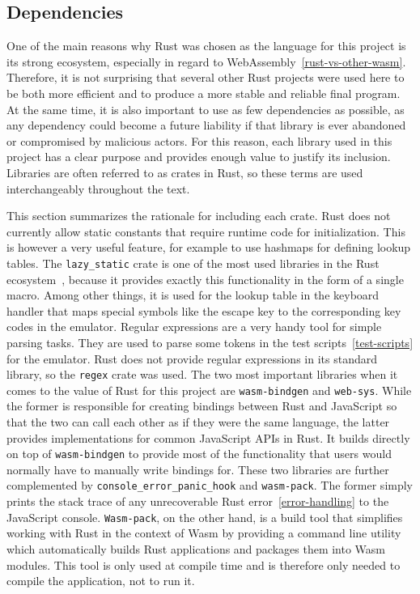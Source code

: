 \subsection{Dependencies}
\label{rust-deps}
One of the main reasons why Rust was chosen as the language for this project is its strong ecosystem, especially in regard to WebAssembly~\ref{rust-vs-other-wasm}.
Therefore, it is not surprising that several other Rust projects were used here to be both more efficient and to produce a more stable and reliable final program.
At the same time, it is also important to use as few dependencies as possible, as any dependency could become a future liability if that library is ever abandoned or compromised by malicious actors.
For this reason, each library used in this project has a clear purpose and provides enough value to justify its inclusion. Libraries are often referred to as crates in Rust, so these terms are used interchangeably throughout the text.

This section summarizes the rationale for including each crate.
Rust does not currently allow static constants that require runtime code for initialization.
This is however a very useful feature, for example to use hashmaps for defining lookup tables.
The \verb+lazy_static+ crate is one of the most used libraries in the Rust ecosystem~\cite[Downloads all time]{lazystatic}, because it provides exactly this functionality in the form of a single macro.
Among other things, it is used for the lookup table in the keyboard handler that maps special symbols like the escape key to the corresponding key codes in the emulator.
Regular expressions are a very handy tool for simple parsing tasks. They are used to parse some tokens in the test scripts~\ref{test-scripts} for the emulator. Rust does not provide regular expressions in its standard library, so the \verb+regex+ crate was used.
\label{web-sys}
The two most important libraries when it comes to the value of Rust for this project are \verb+wasm-bindgen+ and \verb+web-sys+.
While the former is responsible for creating bindings between Rust and JavaScript so that the two can call each other as if they were the same language, the latter provides implementations for common JavaScript APIs in Rust.
It builds directly on top of \verb+wasm-bindgen+ to provide most of the functionality that users would normally have to manually write bindings for.
These two libraries are further complemented by \verb+console_error_panic_hook+ and \verb+wasm-pack+.
The former simply prints the stack trace of any unrecoverable Rust error~\ref{error-handling} to the JavaScript console.
\verb+Wasm-pack+, on the other hand, is a build tool that simplifies working with Rust in the context of Wasm by providing a command line utility which automatically builds Rust applications and packages them into Wasm modules.
This tool is only used at compile time and is therefore only needed to compile the application, not to run it.

